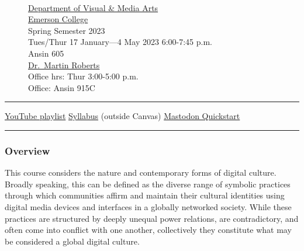 \documentclass[
  letterpaper,
  DIV=11,
  numbers=noendperiod]{scrartcl}
\begin{document}
\begin{figure}
\begin{minipage}[t]{0.02\linewidth}
{\centering 

~

}

\end{minipage}%
%
\begin{minipage}[t]{0.49\linewidth}

{\centering 

\href{https://emerson.edu/academics/academic-departments/visual-media-arts}{Department
of Visual \& Media Arts}\\
\href{https://emerson.edu/}{Emerson College}\\
Spring Semester 2023\\
Tues/Thur 17 January---4 May 2023 6:00-7:45 p.m.\\
Ansin 605\\
\href{http://mroberts.emerson.build/}{Dr.~Martin Roberts}\\
Office hrs: Thur 3:00-5:00 p.m.\\
Office: Ansin 915C\\

}

\end{minipage}%

\end{figure}

\begin{center}\rule{0.5\linewidth}{0.5pt}\end{center}

\href{https://www.youtube.com/playlist?list=PL3uFXkpHLYM7Qmw6Bw1tdTG0Th7xhrVHF}{YouTube
playlist} \textbar{}
\href{https://mroberts.emerson.build/courses/vm-303-01/sp23/}{Syllabus}
(outside Canvas) \textbar{}
\href{https://canvas.emerson.edu/courses/1932613/pages/mastodon-quickstart}{Mastodon
Quickstart} \textbar~

\begin{center}\rule{0.5\linewidth}{0.5pt}\end{center}

\hypertarget{overview}{%
\subsubsection{Overview}\label{overview}}

This course considers the nature and contemporary forms of digital
culture. Broadly speaking, this can be defined as the diverse range of
symbolic practices through which communities affirm and maintain their
cultural identities using digital media devices and interfaces in a
globally networked society. While these practices are structured by
deeply unequal power relations, are contradictory, and often come into
conflict with one another, collectively they constitute what may be
considered a global digital culture.
\end{document}

